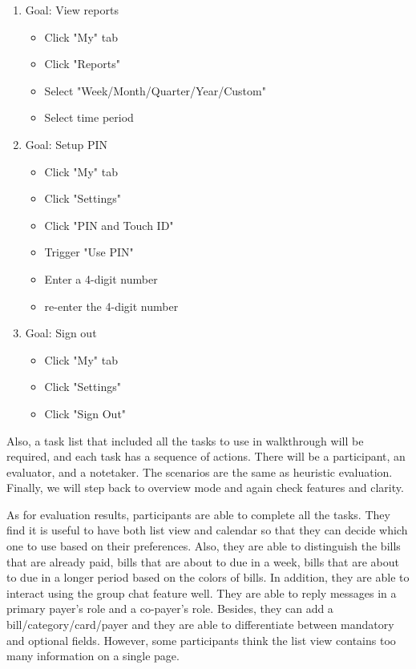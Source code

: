 \documentclass{sigchi}
\begin{document}
\begin{enumerate}
\item Goal: View reports
    \begin{itemize}
        \item Click "My" tab
        \item Click "Reports"
        \item Select "Week/Month/Quarter/Year/Custom"
        \item Select time period
    \end{itemize}

\item Goal: Setup PIN
    \begin{itemize}
        \item Click "My" tab
        \item Click "Settings"
        \item Click "PIN and Touch ID"
        \item Trigger "Use PIN"
        \item Enter a 4-digit number
        \item re-enter the 4-digit number
    \end{itemize}

\item Goal: Sign out
    \begin{itemize}
        \item Click "My" tab
        \item Click "Settings"
        \item Click "Sign Out"
    \end{itemize}
\end{enumerate}

Also, a task list that included all the tasks to use in walkthrough will be required, and each task has a sequence of actions. There will be a participant, an evaluator, and a notetaker. The scenarios are the same as heuristic evaluation. Finally, we will step back to overview mode and again check features and clarity.

As for evaluation results, participants are able to complete all the tasks. They find it is useful to have both list view and calendar so that they can decide which one to use based on their preferences. Also, they are able to distinguish the bills that are already paid, bills that are about to due in a week, bills that are about to due in a longer period based on the colors of bills. In addition, they are able to interact using the group chat feature well. They are able to reply messages in a primary payer's role and a co-payer's role. Besides, they can add a bill/category/card/payer and they are able to differentiate between mandatory and optional fields. However, some participants think the list view contains too many information on a single page. 
\end{document}
